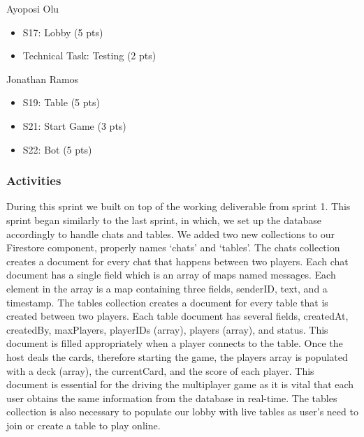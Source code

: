 Ayoposi Olu

\begin{itemize}
    \item S17: Lobby (5 pts)
    \item Technical Task: Testing (2 pts)
\end{itemize}


Jonathan Ramos

\begin{itemize}
    \item S19: Table (5 pts)
    \item S21: Start Game (3 pts)
    \item S22: Bot (5 pts)
\end{itemize}

\subsubsection{Activities}
During this sprint we built on top of the working deliverable from sprint 1. This sprint began similarly to the last sprint, in which, we set up the database accordingly to handle chats and tables. We added two new collections to our Firestore component, properly names `chats' and `tables'. The chats collection creates a document for every chat that happens between two players. Each chat document has a single field which is an array of maps named messages. Each element in the array is a map containing three fields, senderID, text, and a timestamp. The tables collection creates a document for every table that is created between two players. Each table document has several fields, createdAt, createdBy, maxPlayers, playerIDs (array), players (array), and status. This document is filled appropriately when a player connects to the table. Once the host deals the cards, therefore starting the game, the players array is populated with a deck (array), the currentCard, and the score of each player. This document is essential for the driving the multiplayer game as it is vital that each user obtains the same information from the database in real-time. The tables collection is also necessary to populate our lobby with live tables as user's need to join or create a table to play online. 


